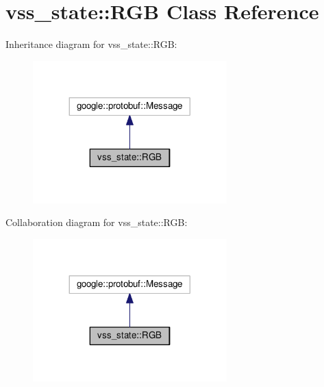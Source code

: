 \hypertarget{classvss__state_1_1RGB}{}\section{vss\+\_\+state\+:\+:R\+GB Class Reference}
\label{classvss__state_1_1RGB}


Inheritance diagram for vss\+\_\+state\+:\+:R\+GB\+:\nopagebreak
\begin{figure}[H]
\begin{center}
\leavevmode
\includegraphics[width=212pt]{classvss__state_1_1RGB__inherit__graph}
\end{center}
\end{figure}


Collaboration diagram for vss\+\_\+state\+:\+:R\+GB\+:\nopagebreak
\begin{figure}[H]
\begin{center}
\leavevmode
\includegraphics[width=212pt]{classvss__state_1_1RGB__coll__graph}
\end{center}
\end{figure}

